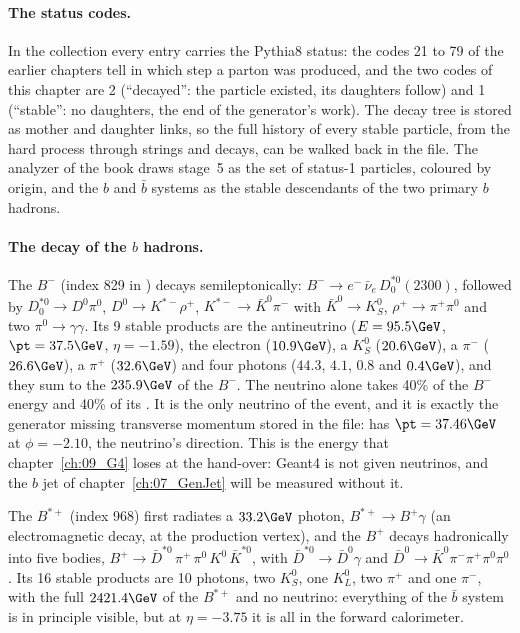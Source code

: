 \paragraph{The status codes.}
In the  collection every entry carries the Pythia8 status: the codes 21 to 79 of the earlier
chapters tell in which step a parton was produced, and the two codes of this chapter are 2 (``decayed'': the
particle existed, its daughters follow) and 1 (``stable'': no daughters, the end of the generator's work). The
decay tree is stored as mother and daughter links, so the full history of every stable particle, from the
hard process through strings and decays, can be walked back in the file. The analyzer of the book draws stage~5 as
the set of status-1 particles, coloured by origin, and the $b$ and $\bar{b}$ systems as the stable descendants of
the two primary $b$ hadrons.

\paragraph{The decay of the $b$ hadrons.}
The $B^-$ (index 829 in ) decays semileptonically: $B^- \to e^-\,\bar{\nu}_e\,D^{*0}_0(2300)$,
followed by $D^{*0}_0 \to D^0\pi^0$, $D^0 \to K^{*-}\rho^+$, $K^{*-} \to \bar{K}^0\pi^-$ with $\bar{K}^0 \to K^0_S$,
$\rho^+ \to \pi^+\pi^0$ and two $\pi^0 \to \gamma\gamma$. Its 9 stable products are the antineutrino
($E = 95.5\GeV$, $\pt = 37.5\GeV$, $\eta = -1.59$), the electron ($10.9\GeV$), a $K^0_S$ ($20.6\GeV$), a $\pi^-$
($26.6\GeV$), a $\pi^+$ ($32.6\GeV$) and four photons ($44.3$, $4.1$, $0.8$ and $0.4\GeV$), and they sum to the
$235.9\GeV$ of the $B^-$. The neutrino alone takes 40\% of the $B^-$ energy and 40\% of its \pt. It is the
only neutrino of the event, and it is exactly the generator missing transverse momentum stored in the file:
 has $\pt = 37.46\GeV$ at $\phi = -2.10$, the neutrino's direction. This is the energy that
chapter~\ref{ch:09_G4} loses at the hand-over: Geant4 is not given neutrinos, and the $b$ jet of
chapter~\ref{ch:07_GenJet} will be measured without it.

The $B^{*+}$ (index 968) first radiates a $33.2\GeV$ photon, $B^{*+} \to B^+\gamma$ (an electromagnetic decay, at the
production vertex), and the $B^+$ decays hadronically into five bodies, $B^+ \to \bar{D}^{*0}\,\pi^+\,\pi^0\,K^0\,\bar{K}^{*0}$,
with $\bar{D}^{*0} \to \bar{D}^0\gamma$ and $\bar{D}^0 \to \bar{K}^0\pi^-\pi^+\pi^0\pi^0$. Its 16 stable products
are 10 photons, two $K^0_S$, one $K^0_L$, two $\pi^+$ and one $\pi^-$, with the full $2421.4\GeV$ of the
$B^{*+}$ and no neutrino: everything of the $\bar{b}$ system is in principle visible, but at $\eta = -3.75$ it is
all in the forward calorimeter.

